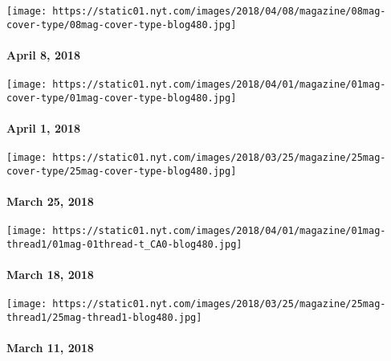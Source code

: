 \href{https://www.nytimes.com/issue/magazine/2018/04/12/4818-issue}{}

\texttt{[image: https://static01.nyt.com/images/2018/04/08/magazine/08mag-cover-type/08mag-cover-type-blog480.jpg]}

\hypertarget{april-8-2018}{%
\paragraph{April 8, 2018}\label{april-8-2018}}

\href{https://www.nytimes.com/issue/magazine/2018/03/30/4118-issue}{}

\texttt{[image: https://static01.nyt.com/images/2018/04/01/magazine/01mag-cover-type/01mag-cover-type-blog480.jpg]}

\hypertarget{april-1-2018}{%
\paragraph{April 1, 2018}\label{april-1-2018}}

\href{https://www.nytimes.com/issue/magazine/2018/03/30/32518-issue}{}

\texttt{[image: https://static01.nyt.com/images/2018/03/25/magazine/25mag-cover-type/25mag-cover-type-blog480.jpg]}

\hypertarget{march-25-2018}{%
\paragraph{March 25, 2018}\label{march-25-2018}}

\href{https://www.nytimes.com/issue/magazine/2018/03/30/31818-issue}{}

\texttt{[image: https://static01.nyt.com/images/2018/04/01/magazine/01mag-thread1/01mag-01thread-t\_CA0-blog480.jpg]}

\hypertarget{march-18-2018}{%
\paragraph{March 18, 2018}\label{march-18-2018}}

\href{https://www.nytimes.com/interactive/2018/03/08/magazine/25-songs-future-of-music.html}{}

\texttt{[image: https://static01.nyt.com/images/2018/03/25/magazine/25mag-thread1/25mag-thread1-blog480.jpg]}

\hypertarget{march-11-2018}{%
\paragraph{March 11, 2018}\label{march-11-2018}}


